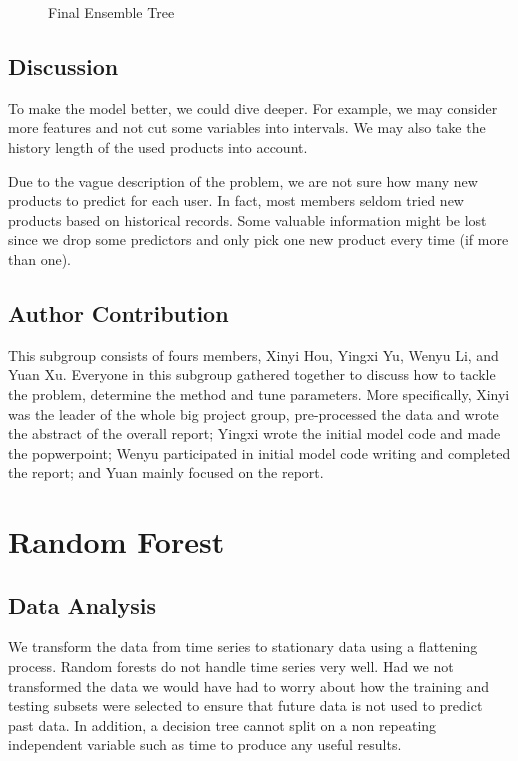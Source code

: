 \documentclass{article}
\begin{document}
\begin{spacing}{1}
\begin{large}
\begin{figure}[H]
\caption{Final Ensemble Tree}
\end{figure}
\newpage


\subsection{Discussion}

To make the model better, we could dive deeper. For example, we may consider more features and not cut some variables into intervals. We may also take the history length of the used products into account.

Due to the vague description of the problem, we are not sure how many new products to predict for each user. In fact, most members seldom tried new products based on historical records. Some valuable information might be lost since we drop some predictors and only pick one new product every time (if more than one).


\subsection{Author Contribution}

This subgroup consists of fours members, Xinyi Hou, Yingxi Yu, Wenyu Li, and Yuan Xu. Everyone in this subgroup gathered together to discuss how to tackle the problem, determine the method and tune parameters. More specifically, Xinyi was the leader of the whole big project group, pre-processed the data and wrote the abstract of the overall report; Yingxi wrote the initial model code and made the popwerpoint; Wenyu participated in initial model code writing and completed the report; and Yuan mainly focused on the report.

\section{Random Forest}
	
\subsection{Data Analysis}

We transform the data from time series to stationary data using a flattening process. Random forests do not handle time series very well. Had we not transformed the data we would have had to worry about how the training and testing subsets were selected to ensure that future data is not used to predict past data. In addition, a decision tree cannot split on a non repeating independent variable such as time to produce any useful results.


\end{large}
\end{spacing}
\end{document}
